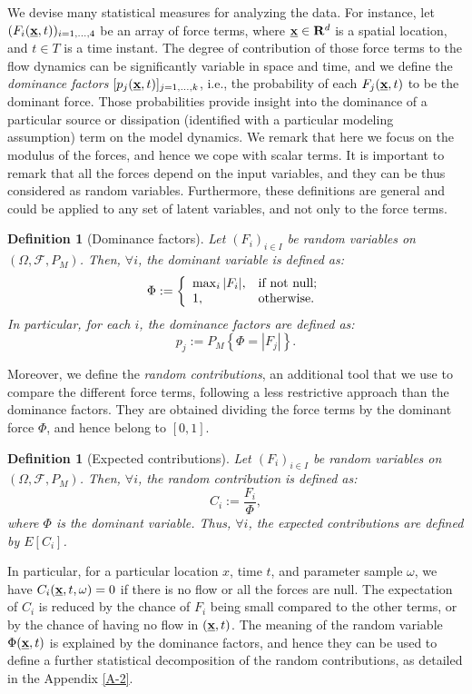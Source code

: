 \documentclass{article}
\newtheorem{definition}[theorem]{Definition}
\begin{document}
We devise many statistical measures for analyzing the data. For instance, let $(F_i(\underline{\textbf x},t))_{i=1,\dots, 4}$ be an array of force terms, where $\underline{\textbf x}\in \mathbf R^d$ is a spatial location, and $t\in T$ is a time instant. The degree of contribution of those force terms to the flow dynamics can be significantly variable in space and time, and we define the \emph{dominance factors} $[p_j(\underline{\textbf x},t)]_{j=1,\dots, k}$, i.e., the probability of each $F_j(\underline{\textbf x},t)$ to be the dominant force. Those probabilities provide insight into the dominance of a particular source or dissipation (identified with a particular modeling assumption) term on the model dynamics. We remark that here we focus on the modulus of the forces, and hence we cope with scalar terms. It is important to remark that all the forces depend on the input variables, and they can be thus considered as random variables. Furthermore, these definitions are general and could be applied to any set of latent variables, and not only to the force terms.

\begin{definition}[Dominance factors]
Let $(F_i)_{i\in I}$ be random variables on $(\Omega, \mathcal F, P_M)$. Then, $\forall i$, the dominant variable is defined as:
$$\Phi:=\left\{
    \begin{array}{ll}
      \max_i |F_i|, & \hbox{if not null;} \\
      1, & \hbox{otherwise.}
    \end{array}
  \right.$$
In particular, for each $i$, the dominance factors are defined as:
$$p_j:=P_M\left\{\Phi=|F_j|\right\}.$$
\end{definition}

Moreover, we define the \emph{random contributions}, an additional tool that we use to compare the different force terms, following a less restrictive approach than the dominance factors. They are obtained dividing the force terms by the dominant force $\Phi$, and hence belong to $[0,1]$.

\begin{definition}[Expected contributions]
Let $(F_i)_{i\in I}$ be random variables on $(\Omega, \mathcal F, P_M)$. Then, $\forall i$, the random contribution is defined as:
$$C_i:=\frac{F_i}{\Phi},$$
where $\Phi$ is the dominant variable. Thus, $\forall i$, the expected contributions are defined by $E\left[C_i\right]$.
\end{definition}

In particular, for a particular location $x$, time $t$, and parameter sample $\omega$, we have $C_i(\underline{\textbf x},t,\omega)=0$ if there is no flow or all the forces are null. The expectation of $C_i$ is reduced by the chance of $F_i$ being small compared to the other terms, or by the chance of having no flow in $(\underline{\textbf x},t)$. The meaning of the random variable $\Phi(\underline{\textbf x},t)$ is explained by the dominance factors, and hence they can be used to define a further statistical decomposition of the random contributions, as detailed in the Appendix \ref{A-2}.
\end{document}
